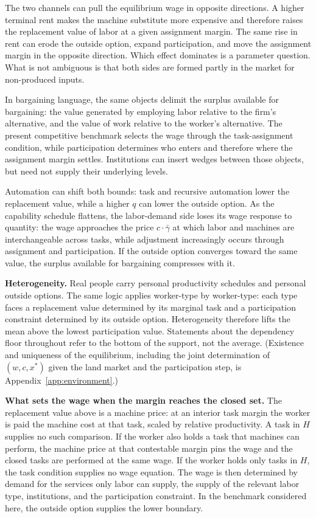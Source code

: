 \documentclass[12pt]{article}
\theoremstyle{plain}
\begin{document}
The two channels can pull the equilibrium wage in opposite directions. A higher
terminal rent makes the machine substitute more expensive and therefore raises
the replacement value of labor at a given assignment margin. The same rise in
rent can erode the outside option, expand participation, and move the assignment
margin in the opposite direction. Which effect dominates is a parameter
question. What is not ambiguous is that both sides are formed partly in the
market for non-produced inputs.

In bargaining language, the same objects delimit the surplus
available for bargaining: the value generated by employing labor relative to
the firm's alternative, and the value of work relative to the worker's
alternative. The present competitive benchmark selects the wage through the
task-assignment condition, while participation determines who enters and
therefore where the assignment margin settles. Institutions can insert wedges
between those objects, but need not supply their underlying levels.

Automation can shift both bounds: task and recursive automation lower the replacement value, while a higher $q$ can lower the outside option. As the capability
schedule flattens, the labor-demand side loses its wage response to quantity: the
wage approaches the price $c\cdot\bar{\gamma}$ at which labor and machines are
interchangeable across tasks, while adjustment increasingly occurs through
assignment and participation. If the outside option
converges toward the same value, the surplus available for bargaining compresses
with it.

\textbf{Heterogeneity.} Real people carry personal productivity schedules and
personal outside options. The same logic applies worker-type by worker-type:
each type faces a replacement value determined by its marginal task and a
participation constraint determined by its outside option. Heterogeneity
therefore lifts the mean above the lowest participation value. Statements about
the dependency floor throughout refer to the bottom of the support, not the
average. (Existence and uniqueness of the equilibrium, including the joint
determination of $(w,c,x^*)$ given the land market and the participation step,
is Appendix~\ref{app:environment}.)

\textbf{What sets the wage when the margin reaches the closed set.}
The replacement value above is a machine price: at an interior task margin the worker
is paid the machine cost at that task, scaled by relative productivity. A
task in $H$ supplies no such comparison. If the worker also holds a task that
machines can perform, the machine price at that contestable margin pins the
wage and the closed tasks are performed at the same wage. If the worker holds
only tasks in $H$, the task condition supplies no wage equation. The wage is
then determined by demand for the services only labor can supply, the supply
of the relevant labor type, institutions, and the participation constraint.
In the benchmark considered here, the outside option supplies the lower
boundary. 
\end{document}
